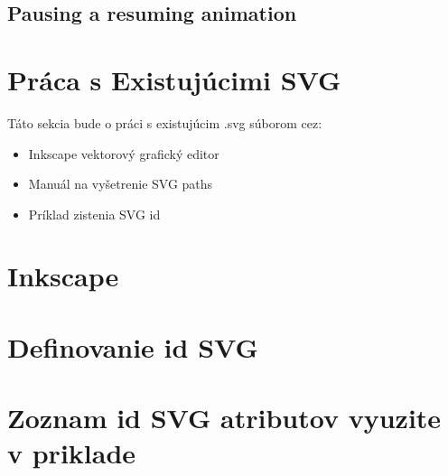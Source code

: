





\subsection{Pausing a resuming animation}

















\section {Práca s Existujúcimi SVG}

Táto sekcia bude o práci s existujúcim .svg súborom cez: 
\begin{itemize}
	\item Inkscape vektorový grafický editor
	\item Manuál na vyšetrenie SVG paths
	\item Príklad zistenia SVG id
\end{itemize}


\section{Inkscape}
\section{Definovanie id SVG}
\section{Zoznam id SVG atributov vyuzite v priklade}
